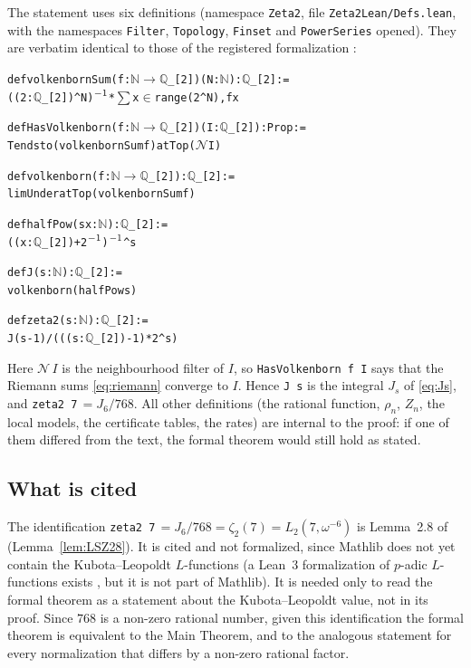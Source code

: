 \documentclass{amsart}
\theoremstyle{definition}
\theoremstyle{remark}
\numberwithin{equation}{section}
\begin{document}
The statement uses six definitions (namespace \texttt{Zeta2}, file
\texttt{Zeta2Lean/Defs.lean}, with the namespaces \texttt{Filter},
\texttt{Topology}, \texttt{Finset} and \texttt{PowerSeries} opened). They are verbatim identical to
those of the registered formalization \cite{DevPair26,PalPair26}:
\begin{alltt}\small
def volkenbornSum (f : \(\mathbb{N}\) \(\to\) \(\mathbb{Q}\)_[2]) (N : \(\mathbb{N}\)) : \(\mathbb{Q}\)_[2] :=
  ((2 : \(\mathbb{Q}\)_[2]) ^ N)\(\sp{-1}\) * \(\sum\) x \(\in\) range (2 ^ N), f x

def HasVolkenborn (f : \(\mathbb{N}\) \(\to\) \(\mathbb{Q}\)_[2]) (I : \(\mathbb{Q}\)_[2]) : Prop :=
  Tendsto (volkenbornSum f) atTop (\(\mathcal{N}\) I)

def volkenborn (f : \(\mathbb{N}\) \(\to\) \(\mathbb{Q}\)_[2]) : \(\mathbb{Q}\)_[2] :=
  limUnder atTop (volkenbornSum f)

def halfPow (s x : \(\mathbb{N}\)) : \(\mathbb{Q}\)_[2] :=
  ((x : \(\mathbb{Q}\)_[2]) + 2\(\sp{-1}\))\(\sp{-1}\) ^ s

def J (s : \(\mathbb{N}\)) : \(\mathbb{Q}\)_[2] :=
  volkenborn (halfPow s)

def zeta2 (s : \(\mathbb{N}\)) : \(\mathbb{Q}\)_[2] :=
  J (s - 1) / (((s : \(\mathbb{Q}\)_[2]) - 1) * 2 ^ s)
\end{alltt}
Here $\mathcal N\,I$ is the neighbourhood filter of $I$, so
\texttt{HasVolkenborn~f~I} says that the Riemann sums \eqref{eq:riemann}
converge to $I$. Hence \texttt{J~s} is the integral $J_s$ of \eqref{eq:Js},
and \texttt{zeta2~7}$\,=J_6/768$. All other definitions (the rational
function, $\rho_n$, $Z_n$, the local models, the certificate tables, the
rates) are internal to the proof: if one of them differed from the text, the
formal theorem would still hold as stated.

\subsection{What is cited}\label{ss:formal-cited}

The identification \texttt{zeta2~7}$\,=J_6/768=\zeta_2(7)=L_2(7,\omega^{-6})$
is Lemma~2.8 of \cite{LSZ26} (Lemma~\ref{lem:LSZ28}). It is cited and not
formalized, since Mathlib does not yet contain the Kubota--Leopoldt
$L$-functions (a Lean~3 formalization of $p$-adic $L$-functions exists
\cite{Nar23}, but it is not part of Mathlib). It is needed only to read the
formal theorem as a statement about the Kubota--Leopoldt value, not in its
proof. Since $768$ is a non-zero rational number, given this identification
the formal theorem is equivalent to the Main Theorem, and to the analogous
statement for every normalization that differs by a non-zero rational factor.
\end{document}
